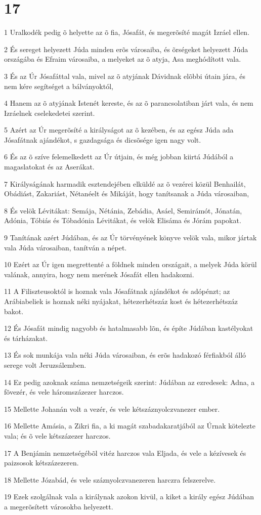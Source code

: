 \chapter{17}

\par 1 Uralkodék pedig õ helyette az õ fia, Jósafát, és megerõsíté magát Izráel ellen.
\par 2 És sereget helyezett Júda minden erõs városaiba, és õrségeket helyezett Júda országába és Efraim városaiba, a melyeket az õ atyja, Asa meghódított vala.
\par 3 És az Úr Jósafáttal vala, mivel az õ atyjának Dávidnak elõbbi útain jára, és nem kére segítséget a bálványoktól,
\par 4 Hanem az õ atyjának Istenét kereste, és az õ parancsolatiban járt vala, és nem Izráelnek cselekedetei szerint.
\par 5 Azért az Úr megerõsíté a királyságot az õ kezében, és az egész Júda ada Jósafátnak ajándékot, s gazdagsága és dicsõsége igen nagy volt.
\par 6 És az õ szíve felemelkedett az Úr útjain, és még jobban kiirtá Júdából a magaslatokat és az Aserákat.
\par 7 Királyságának harmadik esztendejében elküldé az õ vezérei közül Benhailát, Obádiást, Zakariást, Nétanéelt és Mikáját, hogy tanítsanak a Júda városaiban,
\par 8 És velök Lévitákat: Semája, Nétánia, Zebádia, Asáel, Semirámót, Jónatán, Adónia, Tóbiás és Tóbadónia Lévitákat, és velök Elisáma és Jórám papokat.
\par 9 Tanítának azért Júdában, és az Úr törvényének könyve velök vala, mikor jártak vala Júda városaiban, tanítván a népet.
\par 10 Ezért az Úr igen megrettenté a földnek minden országait, a melyek Júda körül valának, annyira, hogy nem merének Jósafát ellen hadakozni.
\par 11 A Filiszteusoktól is hoznak vala Jósafátnak ajándékot és adópénzt; az Arábiabeliek is hoznak néki nyájakat, hétezerhétszáz kost és hétezerhétszáz bakot.
\par 12 És Jósafát mindig nagyobb és hatalmasabb lõn, és építe Júdában kastélyokat és tárházakat.
\par 13 És sok munkája vala néki Júda városaiban, és erõs hadakozó férfiakból álló serege volt Jeruzsálemben.
\par 14 Ez pedig azoknak száma nemzetségeik szerint: Júdában az ezredesek: Adna, a fõvezér, és vele háromszázezer harczos.
\par 15 Mellette Johanán volt a vezér, és vele kétszáznyolczvanezer ember.
\par 16 Mellette Amásia, a Zikri fia, a ki magát szabadakaratjából az Úrnak kötelezte vala; és õ vele kétszázezer harczos.
\par 17 A Benjámin nemzetségébõl vitéz harczos vala Eljada, és vele a kézívesek és paizsosok kétszázezeren.
\par 18 Mellette Józabád, és vele száznyolczvanezeren harczra felszerelve.
\par 19 Ezek szolgálnak vala a királynak azokon kivül, a kiket a király egész Júdában a megerõsített városokba helyezett.

